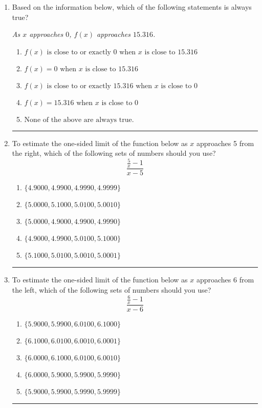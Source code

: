 \documentclass[14pt]{extbook}
\newcommand{\litem}[1]{\item#1\hspace*{-1cm}\rule{\textwidth}{0.4pt}}
\begin{document}
\begin{enumerate}
{\begin{enumerate}[label=\Alph*.]
\end{enumerate} }
\litem{
Based on the information below, which of the following statements is always true?
\begin{center}
    \textit{ As $x$ approaches $0$, $f(x)$ approaches $15.316$. }
\end{center}
\begin{enumerate}[label=\Alph*.]
\item \( f(x) \text{ is close to or exactly } 0 \text{ when } x \text{ is close to } 15.316 \)
\item \( f(x) = 0 \text{ when } x \text{ is close to } 15.316 \)
\item \( f(x) \text{ is close to or exactly } 15.316 \text{ when } x \text{ is close to } 0 \)
\item \( f(x) = 15.316 \text{ when } x \text{ is close to } 0 \)
\item \( \text{None of the above are always true.} \)

\end{enumerate} }
\litem{
To estimate the one-sided limit of the function below as $x$ approaches 5 from the right, which of the following sets of numbers should you use?\[ \frac{\frac{5}{x} - 1}{x - 5} \]\begin{enumerate}[label=\Alph*.]
\item \( \{ 4.9000, 4.9900, 4.9990, 4.9999 \} \)
\item \( \{ 5.0000, 5.1000, 5.0100, 5.0010 \} \)
\item \( \{ 5.0000, 4.9000, 4.9900, 4.9990 \} \)
\item \( \{ 4.9000, 4.9900, 5.0100, 5.1000 \} \)
\item \( \{ 5.1000, 5.0100, 5.0010, 5.0001 \} \)

\end{enumerate} }
\litem{
To estimate the one-sided limit of the function below as $x$ approaches 6 from the left, which of the following sets of numbers should you use?\[ \frac{\frac{6}{x} - 1}{x - 6} \]\begin{enumerate}[label=\Alph*.]
\item \( \{ 5.9000, 5.9900, 6.0100, 6.1000 \} \)
\item \( \{ 6.1000, 6.0100, 6.0010, 6.0001 \} \)
\item \( \{ 6.0000, 6.1000, 6.0100, 6.0010 \} \)
\item \( \{ 6.0000, 5.9000, 5.9900, 5.9990 \} \)
\item \( \{ 5.9000, 5.9900, 5.9990, 5.9999 \} \)

\end{enumerate} }
\end{enumerate}
\end{document}
